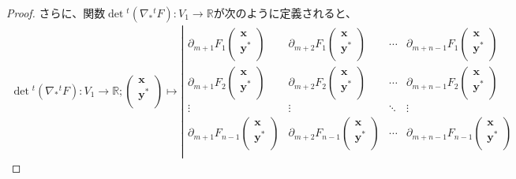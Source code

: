 \documentclass[dvipdfmx]{jsarticle}
\begin{document}
\begin{proof}
さらに、関数$\det{{}^{t}\left( \nabla_{*}{}^{t}F \right)}:V_{1} \rightarrow \mathbb{R}$が次のように定義されると、
\begin{align*}
\det{{}^{t}\left( \nabla_{*}{}^{t}F \right)}:V_{1} \rightarrow \mathbb{R};\begin{pmatrix}
\mathbf{x} \\
\mathbf{y}^{*} \\
\end{pmatrix} \mapsto \left| \begin{matrix}
\partial_{m + 1}F_{1} \begin{pmatrix} \mathbf{x} \\ \mathbf{y}^{*} \\ \end{pmatrix} & \partial_{m + 2}F_{1} \begin{pmatrix} \mathbf{x} \\ \mathbf{y}^{*} \\ \end{pmatrix} & \cdots & \partial_{m + n - 1}F_{1} \begin{pmatrix} \mathbf{x} \\ \mathbf{y}^{*} \\ \end{pmatrix} \\
\partial_{m + 1}F_{2} \begin{pmatrix} \mathbf{x} \\ \mathbf{y}^{*} \\ \end{pmatrix} & \partial_{m + 2}F_{2} \begin{pmatrix} \mathbf{x} \\ \mathbf{y}^{*} \\ \end{pmatrix} & \cdots & \partial_{m + n - 1}F_{2} \begin{pmatrix} \mathbf{x} \\ \mathbf{y}^{*} \\ \end{pmatrix} \\
 \vdots & \vdots & \ddots & \vdots \\
\partial_{m + 1}F_{n - 1} \begin{pmatrix} \mathbf{x} \\ \mathbf{y}^{*} \\ \end{pmatrix} & \partial_{m + 2}F_{n - 1} \begin{pmatrix} \mathbf{x} \\ \mathbf{y}^{*} \\ \end{pmatrix} & \cdots & \partial_{m + n - 1}F_{n - 1} \begin{pmatrix} \mathbf{x} \\ \mathbf{y}^{*} \\ \end{pmatrix} \\

\end{matrix}
\end{align*}
\end{proof}
\end{document}

